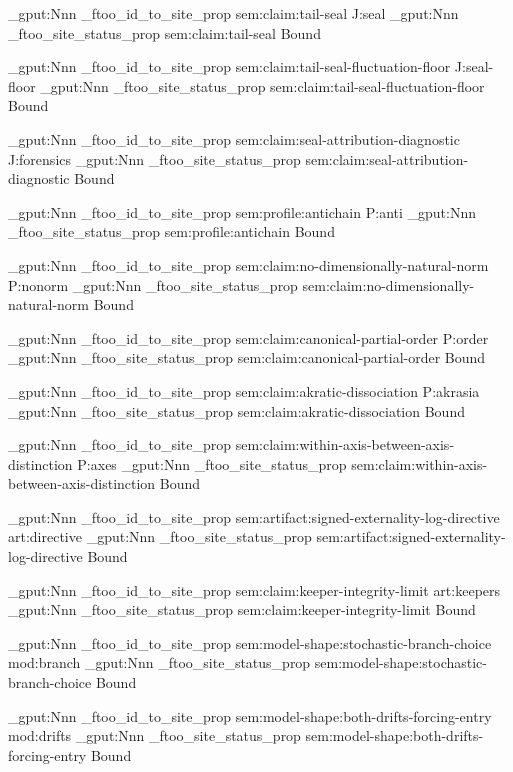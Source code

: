 \prop_gput:Nnn \g_ftoo_id_to_site_prop { sem:claim:tail-seal } { J:seal }
\prop_gput:Nnn \g_ftoo_site_status_prop { sem:claim:tail-seal } { Bound }

\prop_gput:Nnn \g_ftoo_id_to_site_prop { sem:claim:tail-seal-fluctuation-floor } { J:seal-floor }
\prop_gput:Nnn \g_ftoo_site_status_prop { sem:claim:tail-seal-fluctuation-floor } { Bound }

\prop_gput:Nnn \g_ftoo_id_to_site_prop { sem:claim:seal-attribution-diagnostic } { J:forensics }
\prop_gput:Nnn \g_ftoo_site_status_prop { sem:claim:seal-attribution-diagnostic } { Bound }

\prop_gput:Nnn \g_ftoo_id_to_site_prop { sem:profile:antichain } { P:anti }
\prop_gput:Nnn \g_ftoo_site_status_prop { sem:profile:antichain } { Bound }

\prop_gput:Nnn \g_ftoo_id_to_site_prop { sem:claim:no-dimensionally-natural-norm } { P:nonorm }
\prop_gput:Nnn \g_ftoo_site_status_prop { sem:claim:no-dimensionally-natural-norm } { Bound }

\prop_gput:Nnn \g_ftoo_id_to_site_prop { sem:claim:canonical-partial-order } { P:order }
\prop_gput:Nnn \g_ftoo_site_status_prop { sem:claim:canonical-partial-order } { Bound }

\prop_gput:Nnn \g_ftoo_id_to_site_prop { sem:claim:akratic-dissociation } { P:akrasia }
\prop_gput:Nnn \g_ftoo_site_status_prop { sem:claim:akratic-dissociation } { Bound }

\prop_gput:Nnn \g_ftoo_id_to_site_prop { sem:claim:within-axis-between-axis-distinction } { P:axes }
\prop_gput:Nnn \g_ftoo_site_status_prop { sem:claim:within-axis-between-axis-distinction } { Bound }

\prop_gput:Nnn \g_ftoo_id_to_site_prop { sem:artifact:signed-externality-log-directive } { art:directive }
\prop_gput:Nnn \g_ftoo_site_status_prop { sem:artifact:signed-externality-log-directive } { Bound }

\prop_gput:Nnn \g_ftoo_id_to_site_prop { sem:claim:keeper-integrity-limit } { art:keepers }
\prop_gput:Nnn \g_ftoo_site_status_prop { sem:claim:keeper-integrity-limit } { Bound }

\prop_gput:Nnn \g_ftoo_id_to_site_prop { sem:model-shape:stochastic-branch-choice } { mod:branch }
\prop_gput:Nnn \g_ftoo_site_status_prop { sem:model-shape:stochastic-branch-choice } { Bound }

\prop_gput:Nnn \g_ftoo_id_to_site_prop { sem:model-shape:both-drifts-forcing-entry } { mod:drifts }
\prop_gput:Nnn \g_ftoo_site_status_prop { sem:model-shape:both-drifts-forcing-entry } { Bound }

